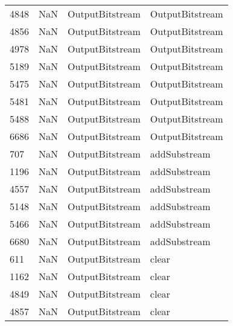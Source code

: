 \begin{tabular}{llll}
4848 &                   NaN &            OutputBitstream &                           OutputBitstream \\
4856 &                   NaN &            OutputBitstream &                           OutputBitstream \\
4978 &                   NaN &            OutputBitstream &                           OutputBitstream \\
5189 &                   NaN &            OutputBitstream &                           OutputBitstream \\
5475 &                   NaN &            OutputBitstream &                           OutputBitstream \\
5481 &                   NaN &            OutputBitstream &                           OutputBitstream \\
5488 &                   NaN &            OutputBitstream &                           OutputBitstream \\
6686 &                   NaN &            OutputBitstream &                           OutputBitstream \\
707  &                   NaN &            OutputBitstream &                              addSubstream \\
1196 &                   NaN &            OutputBitstream &                              addSubstream \\
4557 &                   NaN &            OutputBitstream &                              addSubstream \\
5148 &                   NaN &            OutputBitstream &                              addSubstream \\
5466 &                   NaN &            OutputBitstream &                              addSubstream \\
6680 &                   NaN &            OutputBitstream &                              addSubstream \\
611  &                   NaN &            OutputBitstream &                                     clear \\
1162 &                   NaN &            OutputBitstream &                                     clear \\
4849 &                   NaN &            OutputBitstream &                                     clear \\
4857 &                   NaN &            OutputBitstream &                                     clear \\

\end{tabular}
